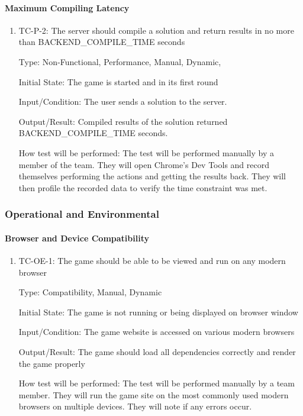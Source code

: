 \documentclass[12pt, titlepage]{article}
\begin{document}
\paragraph{Maximum Compiling Latency}

\begin{enumerate}
\item{TC-P-2: The server should compile a solution and return results in no more than BACKEND\_COMPILE\_TIME seconds}

Type: Non-Functional, Performance, Manual, Dynamic,
					
Initial State: The game is started and in its first round

Input/Condition: The user sends a solution to the server.
					
Output/Result: Compiled results of the solution returned BACKEND\_COMPILE\_TIME seconds.
					
How test will be performed: The test will be performed manually by a member of the team. They will open Chrome's Dev Tools and record themselves performing the actions and getting the results back. They will then profile the recorded data to verify the time constraint was met.
\end{enumerate}

\subsubsection{Operational and Environmental}

\paragraph{Browser and Device Compatibility}

\begin{enumerate}

\item{TC-OE-1: The game should be able to be viewed and run on any modern browser}

Type: Compatibility, Manual, Dynamic
					
Initial State: The game is not running or being displayed on browser window
					
Input/Condition: The game website is accessed on various modern browsers
					
Output/Result: The game should load all dependencies correctly and render the game properly
					
How test will be performed: The test will be performed manually by a team member. They will run the game site on the most commonly used modern browsers on multiple devices. They will note if any errors occur.

\end{enumerate}
\end{document}
